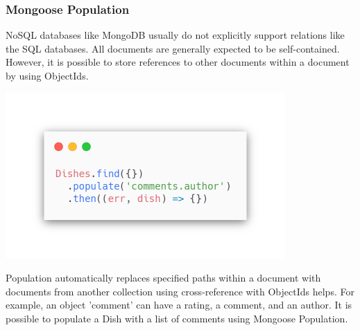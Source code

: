 \subsubsection*{Mongoose Population}
NoSQL databases like MongoDB usually do not explicitly support relations like the SQL databases. All documents are generally expected to be self-contained.
However, it is possible to store references to other documents within a document by using ObjectIds.

\begin{center}
    \includegraphics[width=0.8\textwidth]{assets/population.png}
\end{center}

Population automatically replaces specified paths within a document with documents from another collection using cross-reference with ObjectIds helps.
For example, an object 'comment' can have a rating, a comment, and an author.  It is possible to populate a Dish with a list of comments using Mongoose Population.